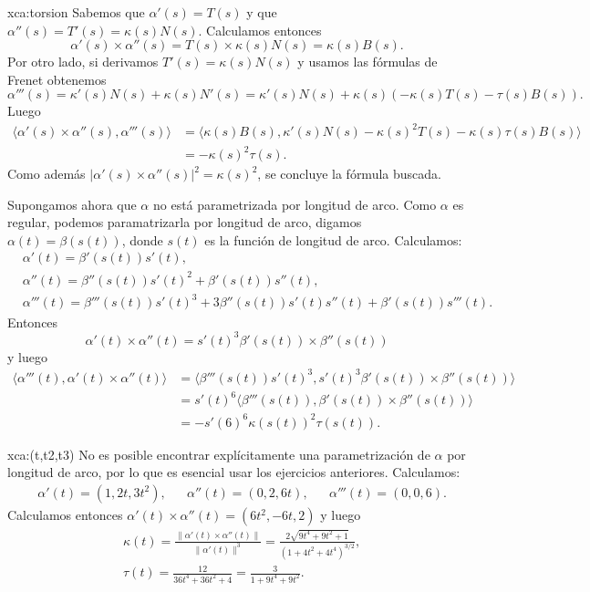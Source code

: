 \begin{sol}{xca:torsion}
	Sabemos que $\alpha'(s)=T(s)$ y que $\alpha''(s)=T'(s)=\kappa(s)N(s)$. 
	Calculamos entonces
	\[
		\alpha'(s)\times\alpha''(s)=T(s)\times \kappa(s)N(s)=\kappa(s)B(s).
	\]
	Por otro lado, si derivamos $T'(s)=\kappa(s)N(s)$ y usamos las fórmulas de
	Frenet obtenemos
	\[
		\alpha'''(s)=\kappa'(s)N(s)+\kappa(s)N'(s)=\kappa'(s)N(s)+\kappa(s)(-\kappa(s)T(s)-\tau(s)B(s)).
	\]
	Luego 
	\begin{align*}
		\langle \alpha'(s)\times\alpha''(s),\alpha'''(s)\rangle
		&=\langle \kappa(s)B(s),\kappa'(s)N(s)-\kappa(s)^2T(s)-\kappa(s)\tau(s)B(s)\rangle\\
		&=-\kappa(s)^2\tau(s).
	\end{align*}
	Como además $|\alpha'(s)\times\alpha''(s)|^2=\kappa(s)^2$, se concluye la fórmula buscada. 

	Supongamos ahora que $\alpha$ no está parametrizada por longitud de arco.
	Como $\alpha$ es regular, podemos paramatrizarla por longitud de arco,
	digamos $\alpha(t)=\beta(s(t))$, donde $s(t)$ es la función de longitud de
	arco.  Calculamos:
	\begin{align*}
		&\alpha'(t) = \beta'(s(t))s'(t),\\
		&\alpha''(t) = \beta''(s(t))s'(t)^2+\beta'(s(t))s''(t),\\
		&\alpha'''(t)=\beta'''(s(t))s'(t)^3+3\beta''(s(t))s'(t)s''(t)+\beta'(s(t))s'''(t).
	\end{align*}
	Entonces
	\[
		\alpha'(t)\times\alpha''(t)=s'(t)^3\beta'(s(t))\times\beta''(s(t))
	\]
	y luego
	\begin{align*}
		\langle \alpha'''(t),\alpha'(t)\times\alpha''(t)\rangle &= 
		\langle\beta'''(s(t))s'(t)^3,s'(t)^3\beta'(s(t))\times\beta''(s(t))\rangle\\
		&=s'(t)^6\langle\beta'''(s(t)),\beta'(s(t))\times\beta''(s(t))\rangle\\
		&=-s'(6)^6\kappa(s(t))^2\tau(s(t)).
	\end{align*}
\end{sol}

\begin{sol}{xca:(t,t2,t3)}
	No es posible encontrar explícitamente una parametrización de $\alpha$ por
	longitud de arco, por lo que es esencial usar los ejercicios anteriores. Calculamos:
	\begin{align*}
		&\alpha'(t)=(1,2t,3t^2), && \alpha''(t)=(0,2,6t), && \alpha'''(t)=(0,0,6).
	\end{align*}
	Calculamos entonces
	$\alpha'(t)\times\alpha''(t)=(6t^2,-6t,2)$ y luego 
	\begin{align*}
		&\kappa(t)=\frac{\|\alpha'(t)\times\alpha''(t)\|}{\|\alpha'(t)\|^3}=\frac{2\sqrt{9t^4+9t^2+1}}{(1+4t^2+4t^4)^{3/2}},\\
		&\tau(t)=\frac{12}{36t^4+36t^2+4}=\frac{3}{1+9t^4+9t^2}.
	\end{align*}
\end{sol}

